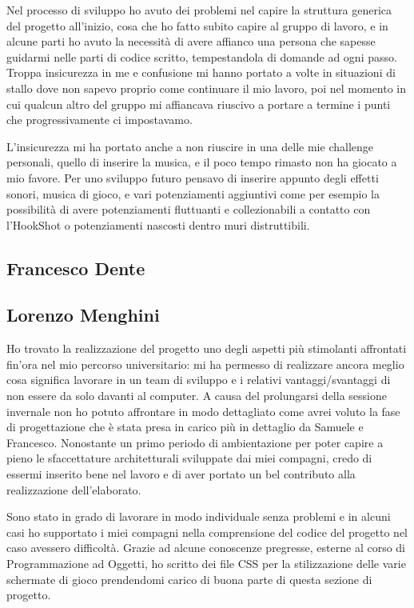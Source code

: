 \documentclass[a4paper,12pt]{report}
\begin{document}
Nel processo di sviluppo ho avuto dei problemi nel capire la struttura generica del progetto all'inizio, cosa che ho fatto subito capire al gruppo di lavoro, e in alcune parti ho avuto la necessità di avere affianco una persona che sapesse guidarmi nelle parti di codice scritto, tempestandola di domande ad ogni passo.
Troppa insicurezza in me e confusione mi hanno portato a volte in situazioni di stallo dove non sapevo proprio come continuare il mio lavoro, poi nel momento in cui qualcun altro del gruppo mi affiancava riuscivo a portare a termine i punti che progressivamente ci impostavamo.

L'insicurezza mi ha portato anche a non riuscire in una delle mie challenge personali, quello di inserire la musica, e il poco tempo rimasto non ha giocato a mio favore.
Per uno sviluppo futuro pensavo di inserire appunto degli effetti sonori, musica di gioco, e vari potenziamenti aggiuntivi come per esempio la possibilità di avere potenziamenti fluttuanti e collezionabili a contatto con l'HookShot o potenziamenti nascosti dentro muri distruttibili.

\subsection*{Francesco Dente}

\subsection*{Lorenzo Menghini}
Ho trovato la realizzazione del progetto uno degli aspetti più stimolanti affrontati fin'ora nel mio percorso universitario: mi ha permesso di realizzare ancora meglio cosa significa lavorare in un team di sviluppo e i relativi vantaggi/svantaggi di non essere da solo davanti al computer.
A causa del prolungarsi della sessione invernale non ho potuto affrontare in modo dettagliato come avrei voluto la fase di progettazione che è stata presa in carico più in dettaglio da Samuele e Francesco. Nonostante un primo periodo di ambientazione per poter capire a pieno le sfaccettature architetturali sviluppate dai miei compagni, credo di essermi inserito bene nel lavoro e di aver portato un bel contributo alla realizzazione dell'elaborato.

Sono stato in grado di lavorare in modo individuale senza problemi e in alcuni casi ho supportato i miei compagni nella comprensione del codice del progetto nel caso avessero difficoltà.
Grazie ad alcune conoscenze pregresse, esterne al corso di Programmazione ad Oggetti, ho scritto dei file CSS per la stilizzazione delle varie schermate di gioco prendendomi carico di buona parte di questa sezione di progetto.
\end{document}
